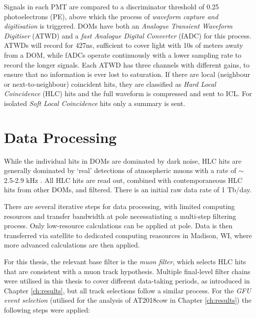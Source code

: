 Signals in each PMT are compared to a discriminator threshold of 0.25 photoelectrons (PE), above which the process of \emph{waveform capture and digitisation} is triggered. DOMs have both an \emph{Analogue Transient Waveform Digitiser} (ATWD)  and a \emph{fast Analogue Digital Converter} (fADC) for this process. ATWDs will record for 427ns, sufficient to cover light with 10s of meters awaty from a DOM, while fADCs operate continuously with a lower sampling rate to record the longer signals. Each ATWD has three channels with different gains, to ensure that no information is ever lost to saturation. If there are local (neighbour or next-to-neighbour) coincident hits, they are classified as \emph{Hard Local Coincidence} (HLC) hits and the full waveform is compressed and sent to ICL. For isolated \emph{Soft Local Coincidence} hits only a summary is sent.

\section{Data Processing}
\label{sec:ic_data}

While the individual hits in DOMs are dominated by dark noise, HLC hits are generally dominated by `real' detections of atmospheric muons with a rate of $\sim$2.5-2.9 kHz \cite{icecube_detector_17}. All HLC hits are read out, combined with contemporaneous HLC hits from other DOMs, and filtered. There is an initial raw data rate of 1 Tb/day. 

There are several iterative steps for data processing, with limited computing resources and transfer bandwidth at pole necessatiating a multi-step filtering process. Only low-resource calculations can be applied at pole. Data is then transferred via satellite to dedicated computing reasources in Madison, WI, where more advanced calculations are then applied.

For this thesis, the relevant base filter is the \emph{muon filter}, which selects HLC hits that are consistent with a muon track hypothesis. Multiple final-level filter chains were utilised in this thesis to cover different data-taking periods, as introduced in Chapter \ref{ch:results}, but all track selections follow a similar process. For the \emph{GFU event selection} \cite{kintscher_thesis} (utilised for the analysis of AT2018cow in Chapter \ref{ch:results}) the following steps were applied:

